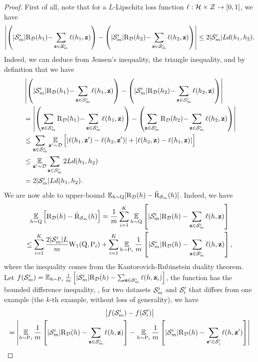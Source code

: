 \begin{noaddcontents}
\begin{proof}
    First of all, note that for a $L$-Lipschitz loss function $\loss: \H\times\Z\to[0,1]$, we have
    \begin{align}
    \LN\LP |\Sm^{i}|\Risk_{\D}(h_1){-}\sum_{\z\in\Sm^{i}}\loss(h_1, \z)\RP - \LP |\Sm^{i}|\Risk_{\D}(h_2){-}\sum_{\z\in\Sm^{i}}\loss(h_2, \z)\RP\right\vert \le 2|\Sm^{i}|Ld(h_1, h_2).\label{eq:alt-proof-supervised-1}
    \end{align}
    Indeed, we can deduce  from Jensen's inequality, the triangle inequality, and by definition that we have
    \begin{align*}
    &\LN\LP |\Sm^{i}|\Risk_{\D}(h_1){-}\sum_{\z\in\Sm^{i}}\loss(h_1, \z)\RP - \LP |\Sm^{i}|\Risk_{\D}(h_2){-}\sum_{\z\in\Sm^{i}}\loss(h_2, \z)\RP\right\vert\\
    &= \LN\LP\sum_{\z\in\Sm^{i}}\Risk_{\D}(h_1){-}\sum_{\z\in\Sm^{i}}\loss(h_1, \z)\RP - \LP\sum_{\z\in\Sm^{i}}\Risk_{\D}(h_2){-}\sum_{\z\in\Sm^{i}}\loss(h_2, \z)\RP\right\vert\\
    &\le \sum_{\z\in\Sm^{i}}\EE_{\z'\sim\D}\Big[ |\loss(h_1, \z')-\loss(h_2, \z')|+|\loss(h_2, \z)-\loss(h_1, \z)|\Big]\\
    &\le \EE_{\z'\sim\D}\sum_{\z\in\Sm^{i}} 2Ld(h_1, h_2)\\
    &= 2|\Sm^{i}|Ld(h_1, h_2).
    \end{align*}
    We are now able to upper-bound $\EE_{h\sim\Q}[ \Risk_{\D}(h) - \Riskhat_{\Sm}(h) ]$. 
    Indeed, we have
    \begin{multline}
    \EE_{h\sim\Q}\Big[ \Risk_{\D}(h) - \Riskhat_{\Sm}(h) \Big] = \frac{1}{m}\sum_{i=1}^{K} \EE_{h\sim\Q}\LB |\Sm^{i}|\Risk_{\D}(h) - \sum_{\z\in\Sm^{i}}\loss(h, \z) \RB\\
    \le \sum_{i=1}^{K} \frac{2|\Sm^{i}|L}{m}\W_{1}(\Q, \P_i) + \sum_{i=1}^{K} \EE_{h\sim\P_i} \frac{1}{m}\LB |\Sm^{i}|\Risk_{\D}(h) - \sum_{\z\in\Sm^{i}} \loss(h, \z) \RB,\label{eq:alt-proof-supervised-2}
    \end{multline}
    where the inequality comes from the Kantorovich-Rubinstein duality theorem.
    Let $f(\Sm^{i})=\EE_{h\sim\P_i} \frac{1}{m}\LB |\Sm^{i}|\Risk_{\D}(h) - \sum_{\z\in\Sm^{i}} \loss(h, \z_i)\RB$, the function has the bounded difference inequality, \ie, for two datasets $\Sm^{i}$ and $\S'_i$ that differs from one example (the $k$-th example, without loss of generality), we have
    \begin{multline*}
    \LN f(\Sm^{i}) - f(\S'_i) \right\vert \\
    = \LN \EE_{h\sim\P_i} \frac{1}{m}\LB |\Sm^{i}|\Risk_{\D}(h) - \sum_{\z\in\Sm^{i}} \loss(h, \z)\RB - \EE_{h\sim\P_i} \frac{1}{m}\LB |\Sm^{i}|\Risk_{\D}(h) - \sum_{\z'\in\S'_i} \loss(h, \z')\RB \right\vert\\

\end{multline*}
\end{proof}
\end{noaddcontents}
